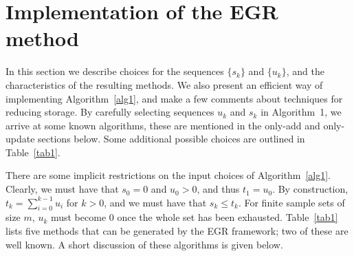 \documentclass[11pt]{article}
\begin{document}
 \section{Implementation of the EGR method}  \label{implementation}
 

 In this section we describe  choices for the sequences $\{s_k\}$ and $\{u_k\}$, and the characteristics of the resulting methods. We also present an efficient way of implementing Algorithm~\ref{alg1}, and make a few comments about techniques for reducing storage. By carefully selecting sequences $u_k$ and $s_k$ in Algorithm~1, we arrive at some known algorithms, these are mentioned in the only-add and only-update sections below. Some additional possible choices are outlined in Table~\ref{tab1}.

There are some implicit restrictions on the input choices of Algorithm~\ref{alg1}. Clearly, we must have that $s_0=0$ and $u_0>0$, and thus $t_1 = u_0$.  By construction, $t_k = \sum_{i=0}^{k-1} u_i$ for $k>0$, and we must have that $s_k \leq t_k$. For finite sample sets of size $m$, $u_k$ must become $0$ once the whole set has been exhausted.
Table~\ref{tab1} lists five methods that can be generated by the EGR framework; two of these are well known. A short discussion of these algorithms is given below.
  
\end{document}
